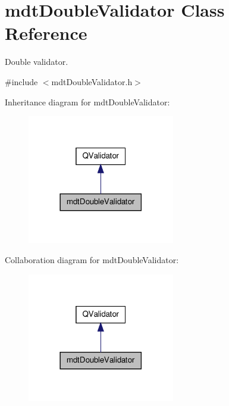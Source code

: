\hypertarget{classmdt_double_validator}{\section{mdt\-Double\-Validator Class Reference}
\label{classmdt_double_validator}
}


Double validator.  




{\ttfamily \#include $<$mdt\-Double\-Validator.\-h$>$}



Inheritance diagram for mdt\-Double\-Validator\-:\nopagebreak
\begin{figure}[H]
\begin{center}
\leavevmode
\includegraphics[width=182pt]{classmdt_double_validator__inherit__graph}
\end{center}
\end{figure}


Collaboration diagram for mdt\-Double\-Validator\-:\nopagebreak
\begin{figure}[H]
\begin{center}
\leavevmode
\includegraphics[width=182pt]{classmdt_double_validator__coll__graph}
\end{center}
\end{figure}
